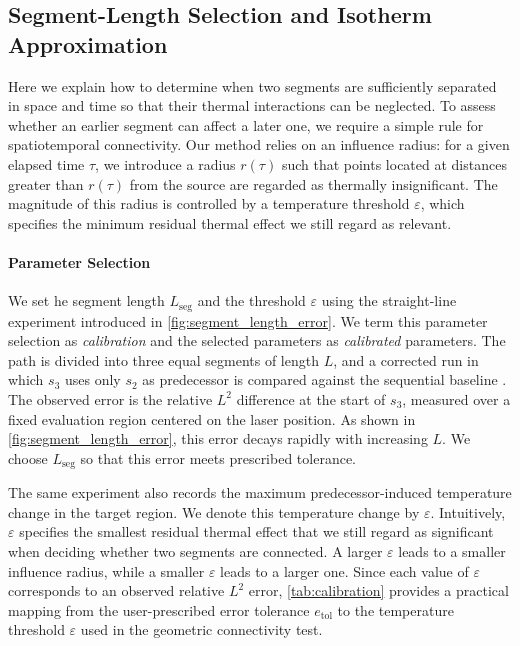\documentclass[conference]{IEEEtran}
\begin{document}
\subsection{Segment-Length Selection and Isotherm Approximation}
\label{seq:calibration_isotherm}
Here we explain how to determine when two segments are sufficiently separated in space and time so that their thermal interactions can be neglected. 
To assess whether an earlier segment can affect a later one, we require a simple rule for spatiotemporal connectivity. 
Our method relies on an influence radius: for a given elapsed time $\tau$, we introduce a radius $r(\tau)$ such that points located at distances greater than $r(\tau)$ from the source are regarded as thermally insignificant. The magnitude of this radius is controlled by a temperature threshold $\varepsilon$, which specifies the minimum residual thermal effect we still regard as relevant.

\paragraph{Parameter Selection}
We set he segment length $L_{\mathrm{seg}}$ and the threshold $\varepsilon$ using the straight-line experiment introduced in \cref{fig:segment_length_error}. 
We term this parameter selection as \emph{calibration} and the selected parameters as \emph{calibrated} parameters.
The path is divided into three equal segments of length $L$, and a corrected run in which $s_3$ uses only $s_2$ as predecessor is compared against the sequential baseline \cite{aydin2026hermes}. The observed error is the relative $L^2$ difference at the start of $s_3$, measured over a fixed evaluation region centered on the laser position. As shown in \cref{fig:segment_length_error}, this error decays rapidly with increasing $L$. We choose $L_{\mathrm{seg}}$ so that this error meets prescribed  tolerance.

The same experiment also records the maximum predecessor-induced temperature change in the target region. We denote this temperature change by $\varepsilon$. Intuitively, $\varepsilon$ specifies the smallest residual thermal effect that we still regard as significant when deciding whether two segments are connected. A larger $\varepsilon$ leads to a smaller influence radius, while a smaller $\varepsilon$ leads to a larger one. Since each value of $\varepsilon$ corresponds to an observed relative $L^2$ error, \cref{tab:calibration} provides a practical mapping from the user-prescribed error tolerance $e_{\mathrm{tol}}$ to the temperature threshold $\varepsilon$ used in the geometric connectivity test.
\end{document}
